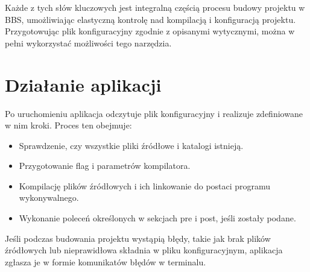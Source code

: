 Każde z tych słów kluczowych jest integralną częścią procesu budowy projektu w BBS, umożliwiając elastyczną kontrolę nad kompilacją i konfiguracją projektu. Przygotowując plik konfiguracyjny zgodnie z opisanymi wytycznymi, można w pełni wykorzystać możliwości tego narzędzia.

\section{Działanie aplikacji}
Po uruchomieniu aplikacja odczytuje plik konfiguracyjny i realizuje zdefiniowane w nim kroki. Proces ten obejmuje:

\begin{itemize}
    \item Sprawdzenie, czy wszystkie pliki źródłowe i katalogi istnieją.
    \item Przygotowanie flag i parametrów kompilatora.
    \item Kompilację plików źródłowych i ich linkowanie do postaci programu wykonywalnego.
    \item Wykonanie poleceń określonych w sekcjach pre i post, jeśli zostały podane.
\end{itemize}

Jeśli podczas budowania projektu wystąpią błędy, takie jak brak plików źródłowych lub nieprawidłowa składnia w pliku konfiguracyjnym, aplikacja zgłasza je w formie komunikatów błędów w terminalu.